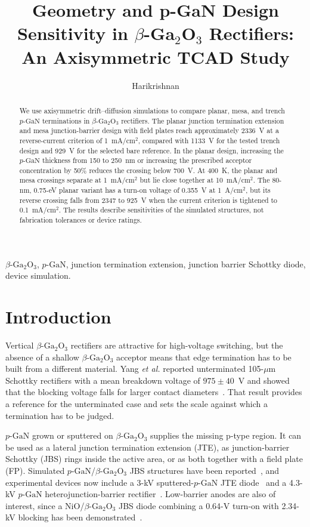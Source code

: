 \documentclass[journal,10pt]{IEEEtran}
\title{Geometry and p-GaN Design Sensitivity in \texorpdfstring{$\beta$-Ga$_2$O$_3$}{beta-Ga2O3} Rectifiers: An Axisymmetric TCAD Study}
\author{Harikrishnan}
\newcommand{\GaO}{\ensuremath{\beta\text{-}\mathrm{Ga}_2\mathrm{O}_3}}
\newcommand{\pGaN}{\ensuremath{p\text{-}\mathrm{GaN}}}
\begin{document}
\maketitle

\begin{abstract}
We use axisymmetric drift--diffusion simulations to compare planar, mesa, and trench \pGaN{} terminations in \GaO{} rectifiers. The planar junction termination extension and mesa junction-barrier design with field plates reach approximately 2336~V at a reverse-current criterion of 1~mA/cm$^2$, compared with 1133~V for the tested trench design and 929~V for the selected bare reference. In the planar design, increasing the \pGaN{} thickness from 150 to 250~nm or increasing the prescribed acceptor concentration by 50\% reduces the crossing below 700~V. At 400~K, the planar and mesa crossings separate at 1~mA/cm$^2$ but lie close together at 10~mA/cm$^2$. The 80-nm, 0.75-eV planar variant has a turn-on voltage of 0.355~V at 1~A/cm$^2$, but its reverse crossing falls from 2347 to 925~V when the current criterion is tightened to 0.1~mA/cm$^2$. The results describe sensitivities of the simulated structures, not fabrication tolerances or device ratings.
\end{abstract}

\begin{IEEEkeywords}
\GaO, \pGaN, junction termination extension, junction barrier Schottky diode, device simulation.
\end{IEEEkeywords}

\section{Introduction}
Vertical \GaO{} rectifiers are attractive for high-voltage switching, but the absence of a shallow \GaO{} acceptor means that edge termination has to be built from a different material. Yang \emph{et al.} reported unterminated 105-$\mu$m Schottky rectifiers with a mean breakdown voltage of $975\pm40$~V and showed that the blocking voltage falls for larger contact diameters~\cite{Yang2017}. That result provides a reference for the unterminated case and sets the scale against which a termination has to be judged.

\pGaN{} grown or sputtered on \GaO{} supplies the missing p-type region. It can be used as a lateral junction termination extension (JTE), as junction-barrier Schottky (JBS) rings inside the active area, or as both together with a field plate (FP). Simulated \pGaN/\GaO{} JBS structures have been reported~\cite{Nandi2021_TED,Than2024_PhysScr}, and experimental devices now include a 3-kV sputtered-\pGaN{} JTE diode~\cite{Chang2025_APL} and a 4.3-kV \pGaN{} heterojunction-barrier rectifier~\cite{Chang2026_TED}. Low-barrier anodes are also of interest, since a NiO/\GaO{} JBS diode combining a 0.64-V turn-on with 2.34-kV blocking has been demonstrated~\cite{Su2024_APL}.
\end{document}
